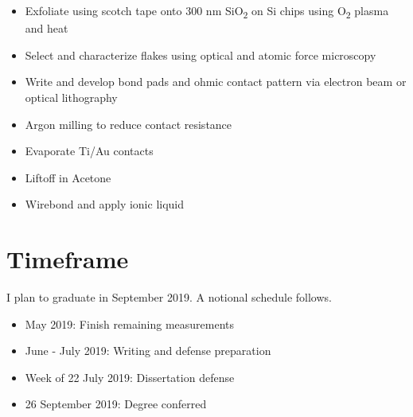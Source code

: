 \documentclass[11pt]{article}
\begin{document}
\begin{itemize}
	\item Exfoliate \rucl using scotch tape onto 300 nm SiO\textsubscript{2} on Si chips using O\textsubscript{2} plasma and heat
	\item Select and characterize flakes using optical and atomic force microscopy
	\item Write and develop bond pads and ohmic contact pattern via electron beam or optical lithography
	\item Argon milling to reduce contact resistance
	\item Evaporate Ti/Au contacts
	\item Liftoff in Acetone
	\item Wirebond and apply ionic liquid
\end{itemize}

\section{Timeframe}
I plan to graduate in September 2019. A notional schedule follows.

\begin{itemize}
	\item May 2019: Finish remaining measurements
	\item June - July 2019: Writing and defense preparation
	\item Week of 22 July 2019: Dissertation defense
	\item 26 September 2019: Degree conferred	
\end{itemize}



\end{document}
